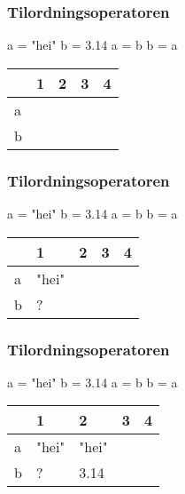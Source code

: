 
\begin{frame}[fragile] 
    \frametitle{Tilordningsoperatoren} 
\begin{python}
a = "hei"
b = 3.14
a = b
b = a
\end{python}

\begin{table}[]
    \begin{tabular}{|l|l|l|l|l|}
    \hline
      & 1       & 2     & 3     & 4 
    \\ \hline
    a &    &  &   & 
    \\ \hline
    b &       &   &  & 
    \\ \hline
    \end{tabular}
\end{table}

\end{frame} 

\begin{frame}[fragile] 
	\frametitle{Tilordningsoperatoren} 
\begin{python}
a = "hei"
b = 3.14
a = b
b = a
\end{python}

\begin{table}[]
    \begin{tabular}{|l|l|l|l|l|}
    \hline
      & 1       & 2     & 3     & 4 
    \\ \hline
    a & "hei"   &  &   &  
    \\ \hline
    b & ?       &   &   & 
    \\ \hline
    \end{tabular}
\end{table}

\end{frame} 

\begin{frame}[fragile] 
	\frametitle{Tilordningsoperatoren} 
\begin{python}
a = "hei"
b = 3.14
a = b
b = a
\end{python}

\begin{table}[]
    \begin{tabular}{|l|l|l|l|l|}
    \hline
      & 1       & 2     & 3     & 4 
    \\ \hline
    a & "hei"   & "hei" &   & 
    \\ \hline
    b & ?       & 3.14  &   & 
    \\ \hline
    \end{tabular}
\end{table}

\end{frame} 

